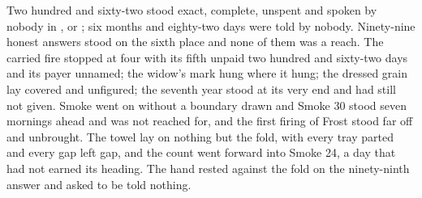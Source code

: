 Two hundred and sixty-two stood exact, complete, unspent and spoken by nobody in ,  or ; six months and eighty-two days were told by nobody. Ninety-nine honest answers stood on the sixth place and none of them was a reach. The carried fire stopped at four with its fifth unpaid two hundred and sixty-two days and its payer unnamed; the widow's mark hung where it hung; the dressed grain lay covered and unfigured; the seventh year stood at its very end and had still not given. Smoke went on without a boundary drawn and Smoke 30 stood seven mornings ahead and was not reached for, and the first firing of Frost stood far off and unbrought. The towel lay on nothing but the fold, with every tray parted and every gap left gap, and the count went forward into Smoke 24, a day that had not earned its heading. The hand rested against the fold on the ninety-ninth answer and asked to be told nothing.
